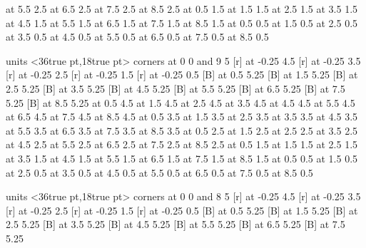  at 5.5 2.5
 at 6.5 2.5
 at 7.5 2.5
 at 8.5 2.5
 at 0.5 1.5
 at 1.5 1.5
 at 2.5 1.5
 at 3.5 1.5
 at 4.5 1.5
 at 5.5 1.5
 at 6.5 1.5
 at 7.5 1.5
 at 8.5 1.5
 at 0.5 0.5
 at 1.5 0.5
 at 2.5 0.5
 at 3.5 0.5
 at 4.5 0.5
 at 5.5 0.5
 at 6.5 0.5
 at 7.5 0.5
 at 8.5 0.5
\endpicture
\bigskip

\beginpicture
\setcoordinatesystem units <36true pt,18true pt>
\putrectangle corners at 0 0 and 9 5
 [r] at -0.25 4.5
 [r] at -0.25 3.5
 [r] at -0.25 2.5
 [r] at -0.25 1.5
 [r] at -0.25 0.5
 [B] at 0.5 5.25
 [B] at 1.5 5.25
 [B] at 2.5 5.25
 [B] at 3.5 5.25
 [B] at 4.5 5.25
 [B] at 5.5 5.25
 [B] at 6.5 5.25
 [B] at 7.5 5.25
 [B] at 8.5 5.25
 at 0.5 4.5
 at 1.5 4.5
 at 2.5 4.5
 at 3.5 4.5
 at 4.5 4.5
 at 5.5 4.5
 at 6.5 4.5
 at 7.5 4.5
 at 8.5 4.5
 at 0.5 3.5
 at 1.5 3.5
 at 2.5 3.5
 at 3.5 3.5
 at 4.5 3.5
 at 5.5 3.5
 at 6.5 3.5
 at 7.5 3.5
 at 8.5 3.5
 at 0.5 2.5
 at 1.5 2.5
 at 2.5 2.5
 at 3.5 2.5
 at 4.5 2.5
 at 5.5 2.5
 at 6.5 2.5
 at 7.5 2.5
 at 8.5 2.5
 at 0.5 1.5
 at 1.5 1.5
 at 2.5 1.5
 at 3.5 1.5
 at 4.5 1.5
 at 5.5 1.5
 at 6.5 1.5
 at 7.5 1.5
 at 8.5 1.5
 at 0.5 0.5
 at 1.5 0.5
 at 2.5 0.5
 at 3.5 0.5
 at 4.5 0.5
 at 5.5 0.5
 at 6.5 0.5
 at 7.5 0.5
 at 8.5 0.5
\endpicture
\bigskip

\beginpicture
\setcoordinatesystem units <36true pt,18true pt>
\putrectangle corners at 0 0 and 8 5
 [r] at -0.25 4.5
 [r] at -0.25 3.5
 [r] at -0.25 2.5
 [r] at -0.25 1.5
 [r] at -0.25 0.5
 [B] at 0.5 5.25
 [B] at 1.5 5.25
 [B] at 2.5 5.25
 [B] at 3.5 5.25
 [B] at 4.5 5.25
 [B] at 5.5 5.25
 [B] at 6.5 5.25
 [B] at 7.5 5.25
